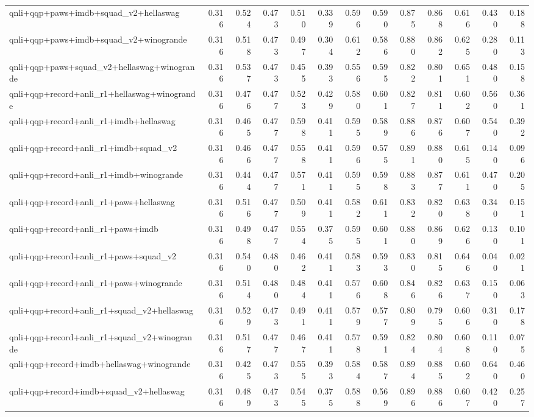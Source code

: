\begin{table}[t]
\begin{tabular}{lrrrrrrrrrrrr}
    qnli+qqp+paws+imdb+squad\_v2+hellaswag & 0.316 & 0.524 & 0.473 & 0.510 & 0.339 & 0.596 & 0.590 & 0.875 & 0.868 & 0.616 & 0.430 & 0.188 \\
    qnli+qqp+paws+imdb+squad\_v2+winogrande & 0.316 & 0.518 & 0.473 & 0.497 & 0.304 & 0.612 & 0.586 & 0.880 & 0.862 & 0.625 & 0.280 & 0.113 \\
    qnli+qqp+paws+squad\_v2+hellaswag+winogrande & 0.316 & 0.537 & 0.473 & 0.455 & 0.393 & 0.556 & 0.595 & 0.822 & 0.801 & 0.651 & 0.480 & 0.158 \\
    qnli+qqp+record+anli\_r1+hellaswag+winogrande & 0.316 & 0.476 & 0.477 & 0.523 & 0.429 & 0.580 & 0.601 & 0.827 & 0.811 & 0.602 & 0.560 & 0.361 \\
    qnli+qqp+record+anli\_r1+imdb+hellaswag & 0.316 & 0.465 & 0.477 & 0.598 & 0.411 & 0.595 & 0.589 & 0.886 & 0.876 & 0.607 & 0.540 & 0.392 \\
    qnli+qqp+record+anli\_r1+imdb+squad\_v2 & 0.316 & 0.466 & 0.477 & 0.558 & 0.411 & 0.596 & 0.575 & 0.891 & 0.880 & 0.615 & 0.140 & 0.096 \\
    qnli+qqp+record+anli\_r1+imdb+winogrande & 0.316 & 0.444 & 0.477 & 0.571 & 0.411 & 0.595 & 0.598 & 0.883 & 0.877 & 0.611 & 0.470 & 0.205 \\
    qnli+qqp+record+anli\_r1+paws+hellaswag & 0.316 & 0.516 & 0.477 & 0.509 & 0.411 & 0.582 & 0.611 & 0.832 & 0.820 & 0.638 & 0.340 & 0.151 \\
    qnli+qqp+record+anli\_r1+paws+imdb & 0.316 & 0.498 & 0.477 & 0.554 & 0.375 & 0.595 & 0.601 & 0.880 & 0.869 & 0.626 & 0.130 & 0.101 \\
    qnli+qqp+record+anli\_r1+paws+squad\_v2 & 0.316 & 0.540 & 0.480 & 0.462 & 0.411 & 0.583 & 0.593 & 0.830 & 0.815 & 0.646 & 0.040 & 0.021 \\
    qnli+qqp+record+anli\_r1+paws+winogrande & 0.316 & 0.514 & 0.480 & 0.484 & 0.411 & 0.576 & 0.608 & 0.846 & 0.826 & 0.637 & 0.150 & 0.063 \\
    qnli+qqp+record+anli\_r1+squad\_v2+hellaswag & 0.316 & 0.529 & 0.473 & 0.491 & 0.411 & 0.579 & 0.577 & 0.809 & 0.795 & 0.606 & 0.310 & 0.178 \\
    qnli+qqp+record+anli\_r1+squad\_v2+winogrande & 0.316 & 0.517 & 0.477 & 0.467 & 0.411 & 0.578 & 0.591 & 0.824 & 0.804 & 0.608 & 0.110 & 0.075 \\
    qnli+qqp+record+imdb+hellaswag+winogrande & 0.316 & 0.425 & 0.473 & 0.555 & 0.393 & 0.584 & 0.587 & 0.894 & 0.885 & 0.602 & 0.640 & 0.460 \\
    qnli+qqp+record+imdb+squad\_v2+hellaswag & 0.316 & 0.489 & 0.473 & 0.545 & 0.375 & 0.588 & 0.569 & 0.896 & 0.886 & 0.607 & 0.420 & 0.257 \\

\end{tabular}
\end{table}
